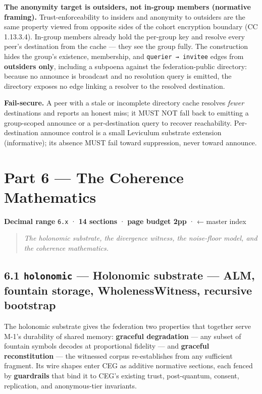 \documentclass[11pt]{article}
\begin{document}
\textbf{The anonymity target is outsiders, not in-group members (normative framing).} Trust-enforceability to insiders and anonymity to outsiders are the same property viewed from opposite sides of the cohort encryption boundary (CC 1.13.3.4). In-group members already hold the per-group key and resolve every peer's destination from the cache — they see the group fully. The construction hides the group's existence, membership, and \texttt{querier → invitee} edges from \textbf{outsiders only}, including a subpoena against the federation-public directory: because no announce is broadcast and no resolution query is emitted, the directory exposes no edge linking a resolver to the resolved destination.


\textbf{Fail-secure.} A peer with a stale or incomplete directory cache resolves \textit{fewer} destinations and reports an honest miss; it MUST NOT fall back to emitting a group-scoped announce or a per-destination query to recover reachability. Per-destination announce control is a small Leviculum substrate extension (informative); its absence MUST fail toward suppression, never toward announce.


\clearpage
\section*{Part 6 — The Coherence Mathematics}


\textbf{Decimal range} \texttt{6.x} · \textbf{14 sections} · \textbf{page budget 2pp} · ← master index


\begin{quote}\itshape The holonomic substrate, the divergence witness, the noise-floor model, and the coherence mathematics.\end{quote}



\subsection*{6.1 \texttt{holonomic} — Holonomic substrate — ALM, fountain storage, WholenessWitness, recursive bootstrap}


The holonomic substrate gives the federation two properties that together serve M-1's durability of shared memory: \textbf{graceful degradation} — any subset of fountain symbols decodes at proportional fidelity — and \textbf{graceful reconstitution} — the witnessed corpus re-establishes from any sufficient fragment. Its wire shapes enter CEG as additive normative sections, each fenced by \textbf{guardrails} that bind it to CEG's existing trust, post-quantum, consent, replication, and anonymous-tier invariants.
\end{document}
